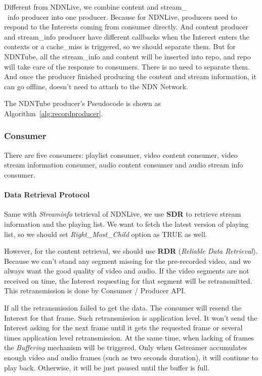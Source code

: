 Different from NDNLive, we combine content and stream\_ \\\ info producer into one producer. Because for NDNLive, producers need to respond to the Interests coming from consumer directly. And content producer and stream\_info producer have different callbacks when the Interest enters the contexts or a cache\_miss is triggered, so we should separate them. But for NDNTube, all the stream\_info and content will be inserted into repo, and repo will take care of the response to consumers. There is no need to separate them. And once the producer finished producing the content and stream information, it can go offline, doesn't need to attach to the NDN Network. 

The NDNTube producer's Pseudocode is shown as Algorithm~\ref{alg:recordproducer}.

\subsubsection{Consumer}

There are five consumers: playlist consumer, video content consumer, video stream information consumer, audio content consumer and audio stream info consumer.

\paragraph{Data Retrieval Protocol} %
\label{par:ndntube_data_retrieval}
\vspace{0.3cm}
Same with \textit{Streaminfo} tetrieval of NDNLive, we use \textbf{SDR} to retrieve stream information and the playing list. We want to fetch the latest version of playing list, so we should set \textit{Right\_Most\_Child} option as TRUE as well.

However, for the content retrieval, we should use \textbf{RDR} (\textit{Reliable Data Retrieval}). Because we can't stand any segment missing for the pre-recorded video, and we always want the good quality of video and audio. If the video segments are not received on time, the Interest requesting for that segment will be retransmitted. This retransmission is done by Consumer / Producer API. 

If all the retransmission failed to get the data. The consumer will resend the Interest for that frame. Such retransmission is application level. It won't send the Interest asking for the next frame until it gets the requested frame or several times application level retransmission. At the same time, when lacking of frames the \textit{Buffering} mechanism will be triggered. Only when Gstreamer accumulates enough video and audio frames (such as two seconds duration), it will continue to play back. Otherwise, it will be just paused until the buffer is full.

